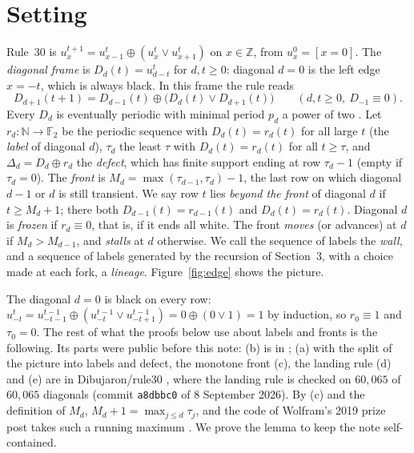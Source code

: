 \documentclass[11pt]{article}
\theoremstyle{definition}
\theoremstyle{remark}
\newcommand{\N}{\mathbb{N}}
\newcommand{\F}{\mathbb{F}_2}
\begin{document}
\section{Setting}\label{sec:setting}

Rule~30 is $u^{t+1}_x=u^t_{x-1}\oplus(u^t_x\vee u^t_{x+1})$ on $x\in\mathbb Z$, from $u^0_x=[x=0]$. The \emph{diagonal frame} is $D_d(t)=u^t_{d-t}$ for $d,t\ge0$: diagonal $d=0$ is the left edge $x=-t$, which is always black. In this frame the rule reads
\begin{equation}\label{eq:frame}
D_{d+1}(t+1)=D_{d-1}(t)\oplus\bigl(D_d(t)\vee D_{d+1}(t)\bigr)\qquad(d,t\ge0,\ D_{-1}\equiv0).
\end{equation}
Every $D_d$ is eventually periodic with minimal period $p_d$ a power of two \cite{Jen86,GG,Rowland}. Let $r_d\colon\N\to\F$ be the periodic sequence with $D_d(t)=r_d(t)$ for all large $t$ (the \emph{label} of diagonal $d$), $\tau_d$ the least $\tau$ with $D_d(t)=r_d(t)$ for all $t\ge\tau$, and $\Delta_d=D_d\oplus r_d$ the \emph{defect}, which has finite support ending at row $\tau_d-1$ (empty if $\tau_d=0$). The \emph{front} is $M_d=\max(\tau_{d-1},\tau_d)-1$, the last row on which diagonal $d-1$ or $d$ is still transient. We say row $t$ lies \emph{beyond the front} of diagonal $d$ if $t\ge M_d+1$; there both $D_{d-1}(t)=r_{d-1}(t)$ and $D_d(t)=r_d(t)$. Diagonal $d$ is \emph{frozen} if $r_d\equiv0$, that is, if it ends all white. The front \emph{moves} (or advances) at $d$ if $M_d>M_{d-1}$, and \emph{stalls} at $d$ otherwise. We call the sequence of labels the \emph{wall}, and a sequence of labels generated by the recursion of Section~3, with a choice made at each fork, a \emph{lineage}. Figure~\ref{fig:edge} shows the picture.

The diagonal $d=0$ is black on every row: $u^{t}_{-t}=u^{t-1}_{-t-1}\oplus(u^{t-1}_{-t}\vee u^{t-1}_{-t+1})=0\oplus(0\vee1)=1$ by induction, so $r_0\equiv1$ and $\tau_0=0$. The rest of what the proofs below use about labels and fronts is the following. Its parts were public before this note: (b) is in \cite{GG}; (a) with the split of the picture into labels and defect, the monotone front (c), the landing rule (d) and (e) are in Dibujaron/rule30 \cite{Dib2}, where the landing rule is checked on $60{,}065$ of $60{,}065$ diagonals (commit \texttt{a8dbbc0} of 8 September 2026). By (c) and the definition of $M_d$, $M_d+1=\max_{j\le d}\tau_j$, and the code of Wolfram's 2019 prize post takes such a running maximum \cite{Wolfram}. We prove the lemma to keep the note self-contained.
\end{document}
